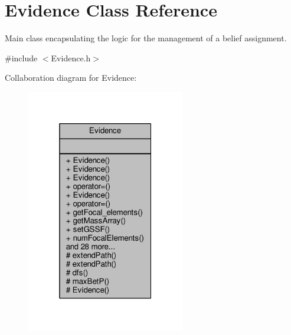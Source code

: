 \hypertarget{classEvidence}{}\section{Evidence Class Reference}
\label{classEvidence}


Main class encapsulating the logic for the management of a belief assignment.  




{\ttfamily \#include $<$Evidence.\+h$>$}



Collaboration diagram for Evidence\+:
\nopagebreak
\begin{figure}[H]
\begin{center}
\leavevmode
\includegraphics[width=196pt]{classEvidence__coll__graph}
\end{center}
\end{figure}
